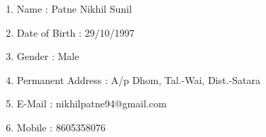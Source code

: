 \documentclass[11pt,fleqn]{book} %
\begin{document}
\begin{enumerate}
\begingroup
\thispagestyle{empty}
\par\normalfont\fontsize{20}{15}\sffamily\selectfont\color{white}

\vspace*{2cm}
    \item Name : Patne Nikhil Sunil\\[0.5cm]
    \item Date of Birth : 29/10/1997\\[0.5cm]
    \item Gender : Male\\[0.5cm] 
    \item Permanent Address : A/p Dhom, Tal.-Wai, Dist.-Satara\\[0.5cm]
    \item E-Mail : nikhilpatne94@gmail.com\\[0.5cm]
    \item Mobile : 8605358076
\end{enumerate}
\endgroup
\end{document}
